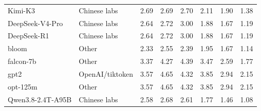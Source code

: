 \begin{tabular}{llrrrrrr}
Kimi-K3 & Chinese labs & 2.69 & 2.69 & 2.70 & 2.11 & 1.90 & 1.38 \\
DeepSeek-V4-Pro & Chinese labs & 2.64 & 2.72 & 3.00 & 1.88 & 1.67 & 1.19 \\
DeepSeek-R1 & Chinese labs & 2.64 & 2.72 & 3.00 & 1.88 & 1.67 & 1.19 \\
bloom & Other & 2.33 & 2.55 & 2.39 & 1.95 & 1.67 & 1.14 \\
falcon-7b & Other & 3.37 & 4.27 & 4.39 & 3.47 & 2.59 & 1.77 \\
gpt2 & OpenAI/tiktoken & 3.57 & 4.65 & 4.32 & 3.85 & 2.94 & 2.15 \\
opt-125m & Other & 3.57 & 4.65 & 4.32 & 3.85 & 2.94 & 2.15 \\
Qwen3.8-2.4T-A95B & Chinese labs & 2.58 & 2.68 & 2.61 & 1.77 & 1.46 & 1.08 \\
\bottomrule
\end{tabular}